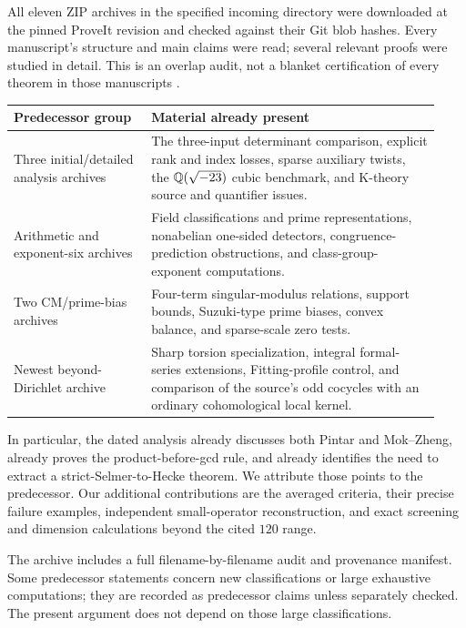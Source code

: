 All eleven ZIP archives in the specified incoming directory were downloaded
at the pinned ProveIt revision and checked against their Git blob hashes.
Every manuscript's structure and main claims were read; several relevant
proofs were studied in detail. This is an overlap audit, not a blanket
certification of every theorem in those manuscripts \cite{prior}.

\begin{longtable}{@{}P{0.30\linewidth}P{0.63\linewidth}@{}}
\toprule
Predecessor group & Material already present\\
\midrule
\endhead
Three initial/detailed analysis archives &
The three-input determinant comparison, explicit rank and index losses,
sparse auxiliary twists, the $\mathbb Q(\sqrt{-23})$ cubic benchmark, and
K-theory source and quantifier issues.\\[4pt]
Arithmetic and exponent-six archives &
Field classifications and prime representations, nonabelian
one-sided detectors, congruence-prediction obstructions, and
class-group-exponent computations.\\[4pt]
Two CM/prime-bias archives &
Four-term singular-modulus relations, support bounds, Suzuki-type
prime biases, convex balance, and sparse-scale zero tests.\\[4pt]
Newest beyond-Dirichlet archive &
Sharp torsion specialization, integral formal-series extensions,
Fitting-profile control, and comparison of the source's odd cocycles
with an ordinary cohomological local kernel.\\
\bottomrule
\end{longtable}

In particular, the dated analysis already discusses both Pintar and
Mok--Zheng, already proves the product-before-gcd rule, and already
identifies the need to extract a strict-Selmer-to-Hecke theorem. We
attribute those points to the predecessor. Our additional contributions
are the averaged criteria, their precise failure examples, independent
small-operator reconstruction, and exact screening and dimension
calculations beyond the cited $120$ range.

The archive includes a full filename-by-filename audit and provenance
manifest. Some predecessor statements concern new classifications or
large exhaustive computations; they are recorded as predecessor
claims unless separately checked. The present argument does not depend
on those large classifications.
